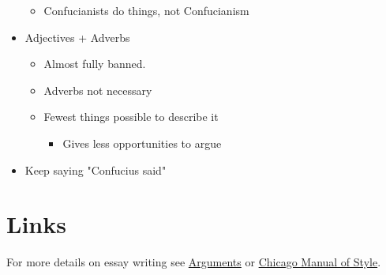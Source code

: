 \documentclass[letterpaper]{article}
\begin{document}
\begin{itemize}
\begin{itemize}
\item Confucianists do things, not Confucianism
\end{itemize}

\item Adjectives + Adverbs

\begin{itemize}
\item Almost fully banned.
\item Adverbs not necessary
\item Fewest things possible to describe it

\begin{itemize}
\item Gives less opportunities to argue
\end{itemize}
\end{itemize}

\item Keep saying "Confucius said"
\end{itemize}

\section{Links}
\label{sec:org7351e21}
For more details on essay writing see \href{Arguments\_51e1a4825d3e4acf81244196d2f27423.md.org}{Arguments} or \href{Chicago\_Manual\_of\_Style\_c75378bd8cde4c7ab7916ea5fcc56326.md.org}{Chicago Manual of Style}.
\end{document}
